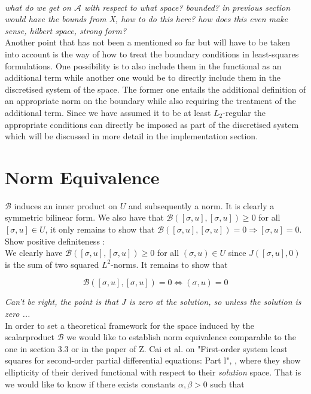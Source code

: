 \documentclass[../draft_1.tex]{subfiles}
\begin{document}
\smallskip
\\
\textit{what do we get on $\mathcal{A}$ with respect to what space? bounded? in previous section would have the bounds from X, how to do this here? how does this even make sense, hilbert space, strong form?}
\smallskip 
\\
Another point that has not been a mentioned so far but will have to be taken into account is the way of how to treat the boundary conditions in least-squares formulations. One possibility is to also include them in the functional as an additional term while another one would be to directly include them in the discretised system of the space. The former one entails the additional definition of an appropriate norm on the boundary while also requiring the treatment of the additional term. Since we have assumed it to be at least $L_2$-regular the appropriate conditions can directly be imposed as part of the discretised system which will be discussed in more detail in the implementation section.

\section{Norm Equivalence}

$\mathcal{B}$ induces an inner product on $U$ and subsequently a norm. It is clearly a symmetric bilinear form. We also have that $ \mathcal{B} ([\sigma, u], [\sigma, u]) \geq 0 $ for all $[\sigma, u] \in U$, it only remains to show that $ \mathcal{B} ([\sigma, u], [\sigma, u]) = 0 \Rightarrow [\sigma, u] = 0 $.  
Show positive definiteness : \\
We clearly have $\mathcal{B}([\sigma, u], [\sigma, u]) \geq 0$ for all $(\sigma, u) \in U$ since $J([\sigma, u], 0)$ is the sum of two squared $L^2$-norms. It remains to show that 
\begin{ceqn}
	\begin{equation}
\mathcal{B}([\sigma, u], [\sigma, u]) = 0  \iff (\sigma, u) = 0
\end{equation}
\end{ceqn}
\textit{Can't be right, the point is that $J$ is zero at the solution, so unless the solution is zero ...}
\bigskip
\\
In order to set a theoretical framework for the space induced by the scalarproduct $\mathcal{B}$ we would like to establish norm equivalence comparable to the one in section 3.3 or in the paper of Z. Cai et al. on "First-order system least squares for second-order partial differential equations: Part l", \cite{cai1994first}, where they show ellipticity of their derived functional with respect to their \textit{solution} space. That is we would like to know if there exists constants $\alpha, \beta > 0$ such that
\end{document}
